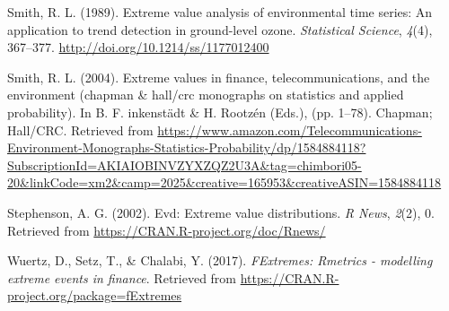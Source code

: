 \documentclass[12pt,oneside]{reedthesis}
\begin{document}
\leavevmode\hypertarget{ref-Smith1989}{}%
Smith, R. L. (1989). Extreme value analysis of environmental time series: An application to trend detection in ground-level ozone. \emph{Statistical Science}, \emph{4}(4), 367--377. \url{http://doi.org/10.1214/ss/1177012400}

\leavevmode\hypertarget{ref-Smith2004}{}%
Smith, R. L. (2004). Extreme values in finance, telecommunications, and the environment (chapman \& hall/crc monographs on statistics and applied probability). In B. F. inkenstädt \& H. Rootzén (Eds.), (pp. 1--78). Chapman; Hall/CRC. Retrieved from \url{https://www.amazon.com/Telecommunications-Environment-Monographs-Statistics-Probability/dp/1584884118?SubscriptionId=AKIAIOBINVZYXZQZ2U3A\&tag=chimbori05-20\&linkCode=xm2\&camp=2025\&creative=165953\&creativeASIN=1584884118}

\leavevmode\hypertarget{ref-Stephenson2002}{}%
Stephenson, A. G. (2002). Evd: Extreme value distributions. \emph{R News}, \emph{2}(2), 0. Retrieved from \url{https://CRAN.R-project.org/doc/Rnews/}

\leavevmode\hypertarget{ref-Wuertz2017}{}%
Wuertz, D., Setz, T., \& Chalabi, Y. (2017). \emph{FExtremes: Rmetrics - modelling extreme events in finance}. Retrieved from \url{https://CRAN.R-project.org/package=fExtremes}


\end{document}
